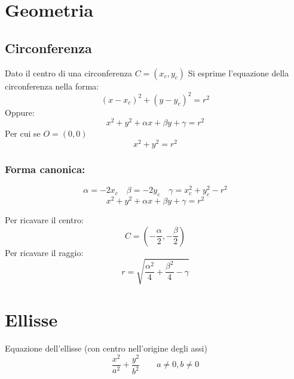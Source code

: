 \section{Geometria}
\subsection{Circonferenza}
Dato il centro di una circonferenza $C=(x_c,y_c)$
Si esprime l'equazione della circonferenza nella forma:
\[(x-x_c)^2+(y-y_c)^2=r^2\]
Oppure:
\[x^2+y^2+\alpha x+ \beta y +\gamma =r^2\]
Per cui se $O=(0,0)$
\[x^2+y^2=r^2\]


\subsubsection{Forma canonica:}
\[\alpha = -2x_c \quad \beta = -2y_c \quad \gamma = x_c^2 + y_c^2 - r^2\]
\[x^2+y^2+\alpha x+ \beta y +\gamma =r^2\]

Per ricavare il centro:
\[C=\left(-\frac{\alpha}{2}, -\frac{\beta}{2}\right)\]
Per ricavare il raggio:
\[r=\sqrt{\frac{\alpha^2}{4}+\frac{\beta^2}{4}-\gamma}\]

\section{Ellisse}
Equazione dell'ellisse (con centro nell'origine degli assi)
\[\frac{x^2}{a^2}+\frac{y^2}{b^2} \qquad a\neq 0 , b\neq 0\]
